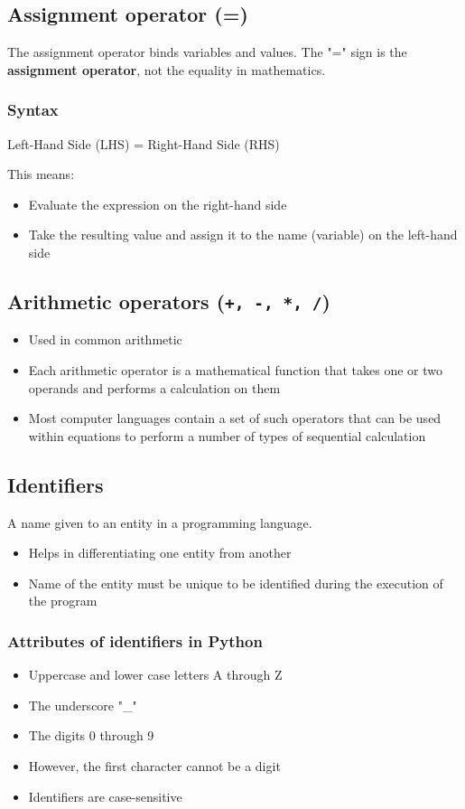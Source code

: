 \documentclass[11pt]{article}
\begin{document}
\subsection{Assignment operator (=)}
\label{sec:orgdc17598}
The assignment operator binds variables and values. The "=" sign is the \textbf{assignment operator}, not the equality in mathematics.

\subsubsection{Syntax}
\label{sec:org421f48b}
Left-Hand Side (LHS) = Right-Hand Side (RHS)

This means:
\begin{itemize}
\item Evaluate the expression on the right-hand side
\item Take the resulting value and assign it to the name (variable) on the left-hand side
\end{itemize}

\subsection{Arithmetic operators (\texttt{+, -, *, /})}
\label{sec:orge1b1a1a}
\begin{itemize}
\item Used in common arithmetic
\item Each arithmetic operator is a mathematical function that takes one or two operands and performs a calculation on them
\item Most computer languages contain a set of such operators that can be used within equations to perform a number of types of sequential calculation
\end{itemize}

\subsection{Identifiers}
\label{sec:org6e43eec}
A name given to an entity in a programming language.
\begin{itemize}
\item Helps in differentiating one entity from another
\item Name of the entity must be unique to be identified during the execution of the program
\end{itemize}

\subsubsection{Attributes of identifiers in Python}
\label{sec:org481d560}
\label{org39026e6}
\begin{itemize}
\item Uppercase and lower case letters A through Z
\item The underscore "\_"
\item The digits 0 through 9
\item However, the first character cannot be a digit
\item Identifiers are case-sensitive
\end{itemize}
\end{document}
